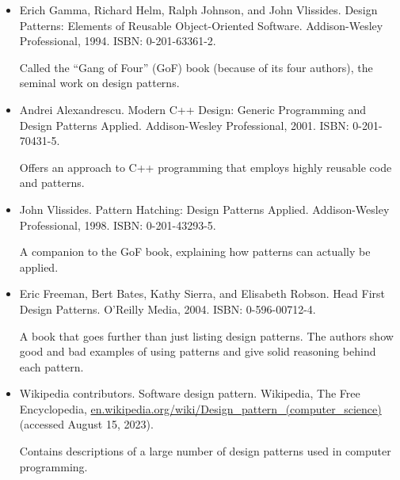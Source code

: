 
\begin{itemize}
\item
Erich Gamma, Richard Helm, Ralph Johnson, and John Vlissides. Design Patterns: Elements of Reusable Object-Oriented Software. Addison-Wesley Professional, 1994. ISBN: 0-201-63361-2.

Called the “Gang of Four” (GoF) book (because of its four authors), the seminal work on design patterns.

\item
Andrei Alexandrescu. Modern C++ Design: Generic Programming and Design Patterns Applied. Addison-Wesley Professional, 2001. ISBN: 0-201-70431-5.

Offers an approach to C++ programming that employs highly reusable code and patterns.

\item
John Vlissides. Pattern Hatching: Design Patterns Applied. Addison-Wesley Professional, 1998. ISBN: 0-201-43293-5.

A companion to the GoF book, explaining how patterns can actually be applied.

\item
Eric Freeman, Bert Bates, Kathy Sierra, and Elisabeth Robson. Head First Design Patterns. O’Reilly Media, 2004. ISBN: 0-596-00712-4.

A book that goes further than just listing design patterns. The authors show good and bad examples of using patterns and give solid reasoning behind each pattern.

\item
Wikipedia contributors. Software design pattern. Wikipedia, The Free Encyclopedia, \url{en.wikipedia.org/wiki/Design_pattern_(computer_science)} (accessed August 15, 2023).

Contains descriptions of a large number of design patterns used in computer programming.
\end{itemize}


